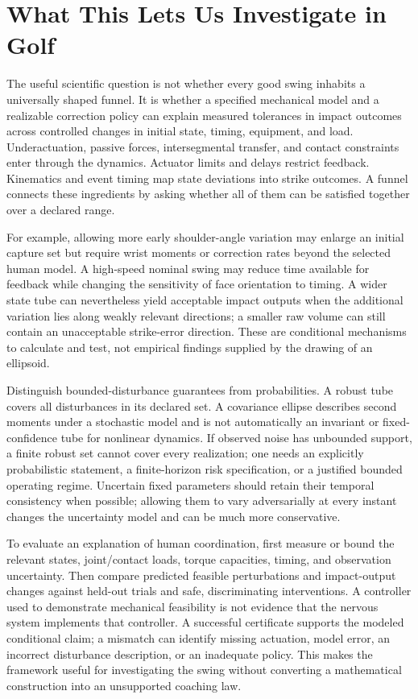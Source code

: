 \section{What This Lets Us Investigate in Golf}

The useful scientific question is not whether every good swing inhabits a universally shaped funnel. It is whether a specified mechanical model and a realizable correction policy can explain measured tolerances in impact outcomes across controlled changes in initial state, timing, equipment, and load. Underactuation, passive forces, intersegmental transfer, and contact constraints enter through the dynamics. Actuator limits and delays restrict feedback. Kinematics and event timing map state deviations into strike outcomes. A funnel connects these ingredients by asking whether all of them can be satisfied together over a declared range.

For example, allowing more early shoulder-angle variation may enlarge an initial capture set but require wrist moments or correction rates beyond the selected human model. A high-speed nominal swing may reduce time available for feedback while changing the sensitivity of face orientation to timing. A wider state tube can nevertheless yield acceptable impact outputs when the additional variation lies along weakly relevant directions; a smaller raw volume can still contain an unacceptable strike-error direction. These are conditional mechanisms to calculate and test, not empirical findings supplied by the drawing of an ellipsoid.

Distinguish bounded-disturbance guarantees from probabilities. A robust tube covers all disturbances in its declared set. A covariance ellipse describes second moments under a stochastic model and is not automatically an invariant or fixed-confidence tube for nonlinear dynamics. If observed noise has unbounded support, a finite robust set cannot cover every realization; one needs an explicitly probabilistic statement, a finite-horizon risk specification, or a justified bounded operating regime. Uncertain fixed parameters should retain their temporal consistency when possible; allowing them to vary adversarially at every instant changes the uncertainty model and can be much more conservative.

To evaluate an explanation of human coordination, first measure or bound the relevant states, joint/contact loads, torque capacities, timing, and observation uncertainty. Then compare predicted feasible perturbations and impact-output changes against held-out trials and safe, discriminating interventions. A controller used to demonstrate mechanical feasibility is not evidence that the nervous system implements that controller. A successful certificate supports the modeled conditional claim; a mismatch can identify missing actuation, model error, an incorrect disturbance description, or an inadequate policy. This makes the framework useful for investigating the swing without converting a mathematical construction into an unsupported coaching law.

